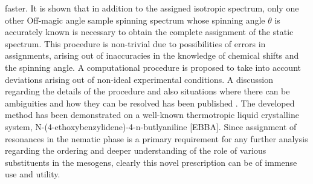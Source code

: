 faster. It is shown that in addition to the assigned isotropic spectrum, only one
other Off-magic angle sample spinning spectrum whose spinning angle $\theta$ is
accurately known is necessary to obtain the complete assignment of the static
spectrum. This procedure is non-trivial due to possibilities of errors in
assignments, arising out of inaccuracies in the knowledge of chemical shifts and
the spinning angle. A computational procedure is proposed to take into account
deviations arising out of non-ideal experimental conditions. A discussion
regarding the details of the procedure and also situations where there can be
ambiguities and how they can be resolved has been published \cite{chap22-key5}. The developed
method has been demonstrated on a well-known thermotropic liquid crystalline
system, N-(4-ethoxybenzylidene)-4-n-butlyaniline [EBBA]. Since assignment of
resonances in the nematic phase is a primary requirement for any further analysis
regarding the ordering and deeper understanding of the role of various
substituents in the mesogens, clearly this novel prescription can be of immense
use and utility.

